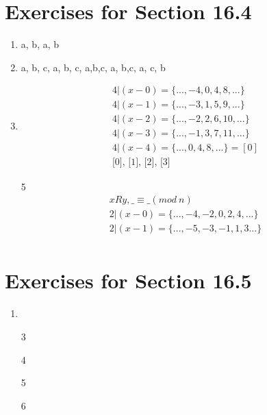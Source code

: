 \documentclass[12pt]{article}
\begin{document}
\section*{Exercises for Section 16.4}
\begin{enumerate}
    \item {{a, b}}, {{a}, {b}}
    \item {{a, b, c}}, {{a}, {b}, {c}}, {{a,b},{c}}, {{a}, {b,c}}, {{a, c}, {b}}
    \item 
	\begin{equation*}
		\begin{split}
		    4|(x-0) = \{..., -4, 0, 4,8,...\}\\
		    4|(x-1) = \{..., -3, 1, 5, 9,...\}\\
		    4|(x-2) = \{..., -2, 2, 6, 10, ...\}\\
		    4|(x-3) = \{..., -1, 3, 7, 11, ...\}\\
		    4|(x-4) = \{..., 0, 4, 8, ...\} = [0]\\
		    \text{{[0], [1], [2], [3]}}
		\end{split}
	\end{equation*}
    \item [5]
	\begin{equation*}
		\begin{split}
			xRy, \_ \equiv \_ (mod\ n)\\
			2|(x-0) = \{..., -4, -2, 0, 2, 4,...\}\\
			2|(x-1) = \{..., -5, -3, -1, 1, 3...\}\\
		\end{split}
	\end{equation*}
\end{enumerate}
\section*{Exercises for Section 16.5}
\begin{enumerate}
	\item 
	\item [3]
	\item [4]
	\item [5]
	\item [6]
\end{enumerate}
\end{document}
